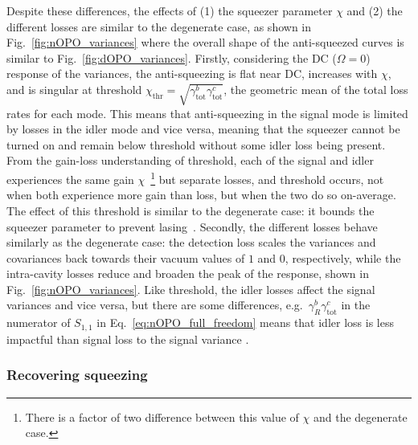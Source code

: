 Despite these differences, the effects of (1) the squeezer parameter $\chi$ and (2) the different losses are similar to the degenerate case, as shown in Fig.~\ref{fig:nOPO_variances} where the overall shape of the anti-squeezed curves is similar to Fig.~\ref{fig:dOPO_variances}. 
Firstly, considering the DC ($\Omega=0$) response of the variances, the anti-squeezing is flat near DC, increases with $\chi$, and is singular at threshold $\chi_\text{thr}=\sqrt{\gamma^b_\text{tot}\gamma^c_\text{tot}}$, the geometric mean of the total loss rates for each mode. This means that anti-squeezing in the signal mode is limited by losses in the idler mode and vice versa, meaning that the squeezer cannot be turned on and remain below threshold without some idler loss being present. %
From the gain-loss understanding of threshold, each of the signal and idler experiences the same gain $\chi$~\footnote{There is a factor of two difference between this value of $\chi$ and the degenerate case.} but separate losses, and threshold occurs, not when both experience more gain than loss, but when the two do so on-average. The effect of this threshold is similar to the degenerate case: it bounds the squeezer parameter to prevent lasing~\cite{}.  
Secondly, the different losses behave similarly as the degenerate case: the detection loss scales the variances and covariances back towards their vacuum values of $1$ and $0$, respectively, while the intra-cavity losses reduce and broaden the peak of the response, shown in Fig.~\ref{fig:nOPO_variances}. Like threshold, the idler losses affect the signal variances and vice versa, but there are some differences, e.g.\ $\gamma^b_R {\gamma^c_\text{tot}}$ in the numerator of $S_{1,1}$ in Eq.~\ref{eq:nOPO_full_freedom} means that idler loss is less impactful than signal loss to the signal variance . 


\subsubsection{Recovering squeezing}
\label{sec:nOPO_combined_readout}

